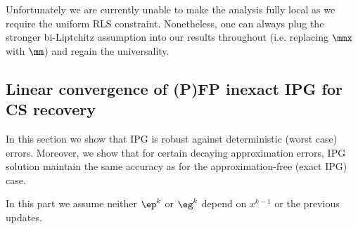 Unfortunately we are currently unable to make the analysis fully local as we require the uniform RLS constraint. Nonetheless, one can always plug the stronger bi-Liptchitz assumption into our results throughout (i.e. replacing $\mmx$ with $\mm$) and regain the universality.  









	
	
	
	

\subsection{Linear convergence of (P)FP inexact IPG for CS recovery}
In this section we show that IPG is robust against deterministic (worst case) errors. Moreover, we show that for certain decaying approximation errors, IPG solution maintain  the same accuracy as for the approximation-free (exact IPG) case.


In this part we assume neither $\ep^k$ or $\eg^k$ depend on $x^{k-1}$ or the previous updates.

{} 

